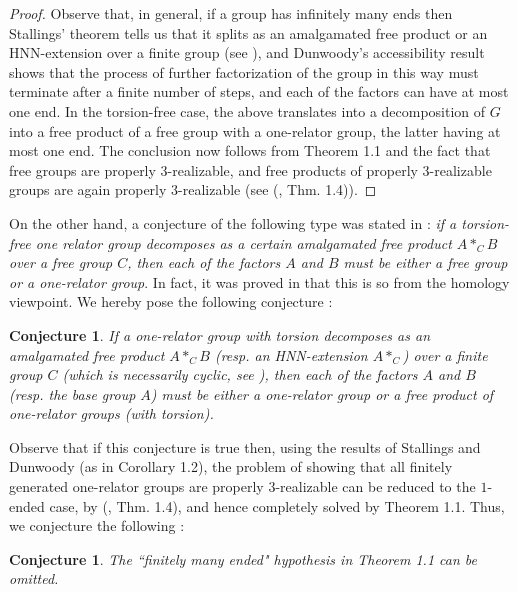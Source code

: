 \documentclass{amsart}[12pt]
\newtheorem{conjecture}[theorem]{Conjecture}
\theoremstyle{definition}
\theoremstyle{remark}
\numberwithin{equation}{section}
\begin{document}
\begin{proof} Observe that, in general, if a group has infinitely many ends
then Stallings' theo\-rem tells us that it splits as an
amalgamated free product or an HNN-extension over a finite group
(see \cite{SWa, Geo}), and Dunwoody's accessibility result
\cite{D} shows that the process of further factorization of the
group in this way must terminate after a finite number of steps,
and each of the factors can have at most one end. In the
torsion-free case, the above translates into a decomposition of
$G$ into a free product of a free group with a one-relator group,
the latter having at most one end. The conclusion now follows from
Theorem 1.1 and the fact that free groups are properly
$3$-realizable, and free pro\-ducts of properly $3$-realizable
groups are again properly $3$-realizable (see (\cite{ACLQ}, Thm.
1.4)).
\end{proof}
\indent On the other hand, a conjecture of the following type was
stated in \cite{FP}: {\it if a torsion-free one relator group
decomposes as a certain amalgamated free product $A*_CB$ over a
free group $C$, then each of the factors $A$ and $B$ must be
either a free group or a one-relator group}. In fact, it was
proved in \cite{FP} that this is so from the homology viewpoint.
We hereby pose the following conjecture :
\begin{conjecture} If a one-relator group with torsion
decomposes as an amalgamated free product $A*_CB$ (resp. an
HNN-extension $A*_C$) over a finite group $C$ (which is
necessarily cyclic, see \cite{KS,LS}), then each of the factors
$A$ and $B$ (resp. the base group $A$) must be either a
one-relator group or a free product of one-relator groups (with
torsion).
\end{conjecture}
\indent Observe that if this conjecture is true then, using the
results of Stallings and Dunwoody (as in Corollary 1.2), the
problem of showing that all finitely generated one-relator groups
are properly $3$-realizable can be reduced to the $1$-ended case,
by (\cite{ACLQ}, Thm. 1.4), and hence completely solved by Theorem
1.1. Thus, we conjecture the following :
\begin{conjecture} The ``finitely many ended" hypothesis in
Theorem 1.1 can be omitted.
\end{conjecture}
\end{document}
